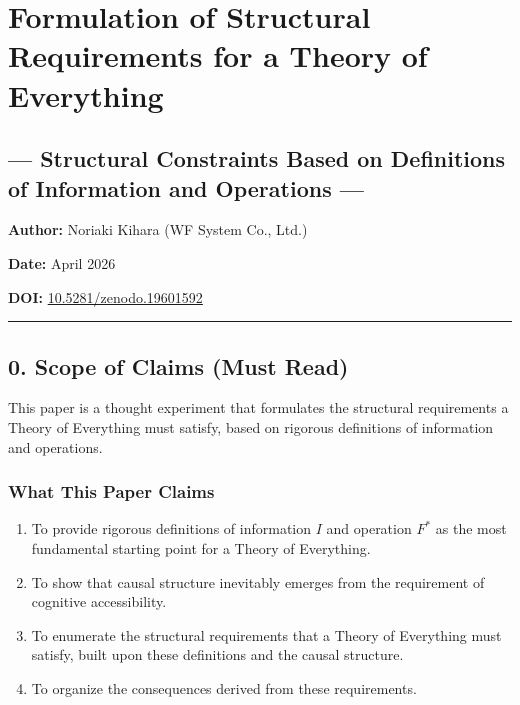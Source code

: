 \documentclass[a4paper,11pt]{article}
\providecommand{\tightlist}{\setlength{\itemsep}{0pt}\setlength{\parskip}{0pt}}
\begin{document}
\section{Formulation of Structural Requirements for a Theory of
Everything}\label{formulation-of-structural-requirements-for-a-theory-of-everything}

\subsection{--- Structural Constraints Based on Definitions of
Information and Operations
---}\label{structural-constraints-based-on-definitions-of-information-and-operations}

\textbf{Author:} Noriaki Kihara (WF System Co., Ltd.)

\textbf{Date:} April 2026

\textbf{DOI:}
\href{https://doi.org/10.5281/zenodo.19601592}{10.5281/zenodo.19601592}

\begin{center}\rule{0.5\linewidth}{0.5pt}\end{center}

\subsection{0. Scope of Claims (Must
Read)}\label{scope-of-claims-must-read}

This paper is a thought experiment that formulates the structural
requirements a Theory of Everything must satisfy, based on rigorous
definitions of information and operations.

\subsubsection{What This Paper Claims}\label{what-this-paper-claims}

\begin{enumerate}
\def\labelenumi{\arabic{enumi}.}
\tightlist
\item
  To provide rigorous definitions of information \(I\) and operation
  \(F^*\) as the most fundamental starting point for a Theory of
  Everything.
\item
  To show that causal structure inevitably emerges from the requirement
  of cognitive accessibility.
\item
  To enumerate the structural requirements that a Theory of Everything
  must satisfy, built upon these definitions and the causal structure.
\item
  To organize the consequences derived from these requirements.
\end{enumerate}
\end{document}

